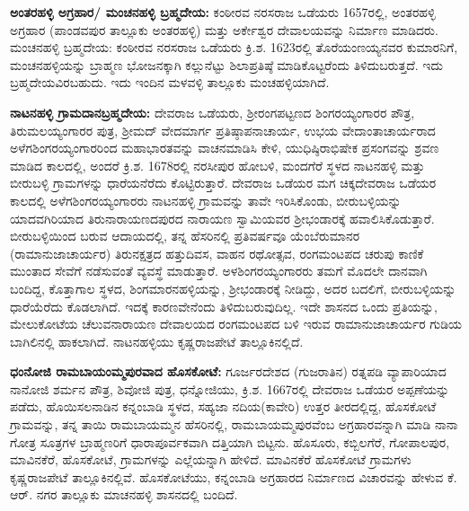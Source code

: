 \textbf{ಅಂತರಹಳ್ಳಿ ಅಗ್ರಹಾರ/ ಮಂಚನಹಳ್ಳಿ ಬ್ರಹ್ಮದೇಯ:} ಕಂಠೀರವ ನರಸರಾಜ ಒಡೆಯರು 1657ರಲ್ಲಿ, ಅಂತರಹಳ್ಳಿ ಅಗ್ರಹಾರ (ಪಾಂಡವಪುರ ತಾಲ್ಲೂಕು ಅಂತರಹಳ್ಳಿ) ಮತ್ತು ಅರ್ಕೇಶ್ವರ ದೇವಾಲಯವನ್ನು ನಿರ್ಮಾಣ ಮಾಡಿದರು. ಮಂಚನಹಳ್ಳಿ ಬ್ರಹ್ಮದೇಯ: ಕಂಠೀರವ ನರಸರಾಜ ಒಡೆಯರು ಕ್ರಿ.ಶ. 1623ರಲ್ಲಿ ತೊರೆಯಂಣಯ್ಯನವರ ಕುಮಾರನಿಗೆ, ಮಂಚನಹಳ್ಳಿಯನ್ನು ಬ್ರಾಹ್ಮಣ ಭೋಜನಕ್ಕಾಗಿ ಕಲ್ಲುನೆಟ್ಟು ಶಿಲಾಪ್ರತಿಷ್ಠೆ ಮಾಡಿಕೊಟ್ಟರೆಂದು ತಿಳಿದುಬರುತ್ತದೆ. ಇದು ಬ್ರಹ್ಮದೇಯವಿರಬಹುದು. ಇದು ಇಂದಿನ ಮಳವಳ್ಳಿ ತಾಲ್ಲೂಕು ಮಂಚಹಳ್ಳಿಯಾಗಿದೆ.

\textbf{ನಾಟನಹಳ್ಳಿ ಗ್ರಾಮದಾನ\general{\enginline{-}}ಬ್ರಹ್ಮದೇಯ:} ದೇವರಾಜ ಒಡೆಯರು, ಶ‍್ರೀರಂಗಪಟ್ಟಣದ ಶಿಂಗರಯ್ಯಂಗಾರರ ಪೌತ್ರ, ತಿರುಮಲಯ್ಯಂಗಾರರ ಪುತ್ರ, ಶ‍್ರೀಮದ್​ ವೇದಮಾರ್ಗ ಪ್ರತಿಷ್ಠಾಪನಾಚಾರ್ಯ, ಉಭಯ ವೇದಾಂತಾಚಾರ್ಯರಾದ ಅಳೆಗಶಿಂಗರಯ್ಯಂಗಾರರಿಂದ ಮಹಾಭಾರತವನ್ನು ವಾಚನಮಾಡಿಸಿ ಕೇಳಿ, ಯುಧಿಷ್ಠಿರಾಭಿಷೇಕ ಪ್ರಸಂಗವನ್ನು ಶ್ರವಣ ಮಾಡಿದ ಕಾಲದಲ್ಲಿ, ಅಂದರೆ ಕ್ರಿ.ಶ. 1678ರಲ್ಲಿ ನರಸೀಪುರ ಹೋಬಳಿ, ಮಂದಗೆರೆ ಸ್ಥಳದ ನಾಟನಹಳ್ಳಿ ಮತ್ತು ಬೀರುಬಳ್ಳಿ ಗ್ರಾಮಗಳನ್ನು ಧಾರೆಯನೆರೆದು ಕೊಟ್ಟಿರುತ್ತಾರೆ. ದೇವರಾಜ ಒಡೆಯರ ಮಗ ಚಿಕ್ಕದೇವರಾಜ ಒಡೆಯರ ಕಾಲದಲ್ಲಿ ಅಳೆಗಶಿಂಗರಯ್ಯಂಗಾರರು ನಾಟನಹಳ್ಳಿ ಗ್ರಾಮವನ್ನು ತಾವೇ ಇರಿಸಿಕೊಂಡು, ಬೀರುಬಳ್ಳಿಯನ್ನು ಯಾದವಗಿರಿಯಾದ ತಿರುನಾರಾಯಣದಪುರದ ನಾರಾಯಣ ಸ್ವಾಮಿಯವರ ಶ‍್ರೀಭಂಡಾರಕ್ಕೆ ಹವಾಲಿಸಿಕೊಡುತ್ತಾರೆ. ಬೀರುಬಳ್ಳಿಯಿಂದ ಬರುವ ಆದಾಯದಲ್ಲಿ, ತನ್ನ ಹೆಸರಿನಲ್ಲಿ ಪ್ರತಿವರ್ಷವೂ ಯೆಂಬೆರುಮಾನರ (ರಾಮಾನುಜಾಚಾರ್ಯರ) ತಿರುನಕ್ಷತ್ರದ ಹತ್ತುದಿವಸ, ವಾಹನ ರಥೋತ್ಸವ, ರಂಗಮಂಟಪದ ಚರುಪು ಕಾಣಿಕೆ ಮುಂತಾದ ಸೇವೆಗೆ ನಡೆಸುವಂತೆ ವ್ಯವಸ್ಥೆ ಮಾಡುತ್ತಾರೆ. ಅಳಶಿಂಗರಯ್ಯಂಗಾರರು ತಮಗೆ ಮೊದಲೇ ದಾನವಾಗಿ ಬಂದಿದ್ದ, ಕೊತ್ತಾಗಾಲ ಸ್ಥಳದ, ಶಿಂಗಮಾರನಹಳ್ಳಿಯನ್ನು, ಶ‍್ರೀಭಂಡಾರಕ್ಕೆ ನೀಡಿದ್ದು, ಅದರ ಬದಲಿಗೆ, ಬೀರುಬಳ್ಳಿಯನ್ನು ಧಾರೆಯೆರೆದು ಕೊಡಲಾಗಿದೆ. ಇದಕ್ಕೆ ಕಾರಣವೇನೆಂದು ತಿಳಿದುಬರುವುದಿಲ್ಲ.  ಇದೇ ಶಾಸನದ ಒಂದು ಪ್ರತಿಯನ್ನು, ಮೇಲುಕೋಟೆಯ ಚೆಲುವನಾರಾಯಣ ದೇವಾಲಯದ ರಂಗಮಂಟಪದ ಬಳಿ ಇರುವ ರಾಮಾನುಜಾಚಾರ್ಯರ ಗುಡಿಯ ಬಾಗಿಲಿನಲ್ಲಿ ಹಾಕಲಾಗಿದೆ. ನಾಟನಹಳ್ಳಿಯು ಕೃಷ್ಣರಾಜಪೇಟೆ ತಾಲ್ಲೂಕಿನಲ್ಲಿದೆ.

\textbf{ಧಂನೋಜಿ ರಾಮಬಾಯಂಮ್ಮಪುರವಾದ ಹೊಸಕೋಟೆ:} ಗೂರ್ಜರದೇಶದ (ಗುಜರಾತಿನ) ರತ್ನಪಡಿ ವ್ಯಾಪಾರಿಯಾದ ನಾನೋಜಿ ಶರ್ಮನ ಪೌತ್ರ, ಶಿವೋಜಿ ಪುತ್ರ, ಧನ್ನೋಜಿಯು, ಕ್ರಿ.ಶ. 1667ರಲ್ಲಿ ದೇವರಾಜ ಒಡೆಯರ ಅಪ್ಪಣೆಯನ್ನು ಪಡೆದು, ಹೊಯಿಸಲನಾಡಿನ ಕನ್ನಂಬಾಡಿ ಸ್ಥಳದ, ಸಹ್ಯಜಾ ನದಿಯ(ಕಾವೇರಿ) ಉತ್ತರ ತೀರದಲ್ಲಿದ್ದ, ಹೊಸಕೋಟೆ ಗ್ರಾಮವನ್ನು, ತನ್ನ ತಾಯಿ ರಾಮಬಾಯಮ್ಮನ ಹೆಸರಿನಲ್ಲಿ, ರಾಮಬಾಯಮ್ಮಪುರವೆಂಬ ಅಗ್ರಹಾರವನ್ನಾಗಿ ಮಾಡಿ ನಾನಾ ಗೋತ್ರ ಸೂತ್ರಗಳ ಬ್ರಾಹ್ಮಣರಿಗೆ ಧಾರಾಪೂರ್ವಕವಾಗಿ ದತ್ತಿಯಾಗಿ ಬಿಟ್ಟನು. ಹೊಸೂರು, ಕಬ್ಬಿಲಗೆರೆ, ಗೋಪಾಲಪುರ, ಮಾವಿನಕೆರೆ, ಹೊಸಕೋಟೆ, ಗ್ರಾಮಗಳನ್ನು ಎಲ್ಲೆಯನ್ನಾಗಿ ಹೇಳಿದೆ. ಮಾವಿನಕೆರೆ ಹೊಸಕೋಟೆ ಗ್ರಾಮಗಳು ಕೃಷ್ಣರಾಜಪೇಟೆ ತಾಲ್ಲೂಕಿನಲ್ಲಿವೆ. ಹೊಸಕೋಟೆಯು, ಕನ್ನಂಬಾಡಿ ಅಗ್ರಹಾರದ ನಿರ್ಮಾಣದ ವಿಚಾರವನ್ನು ಹೇಳುವ ಕೆ. ಆರ್. ನಗರ ತಾಲ್ಲೂಕು ಮಾಚನಹಳ್ಳಿ ಶಾಸನದಲ್ಲಿ ಬಂದಿದೆ.

